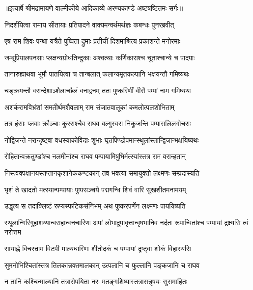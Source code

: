 {॥इत्यार्षे श्रीमद्रामायणे वाल्मीकीये आदिकाव्ये अरण्यकाण्डे अष्टषष्टितमः सर्गः॥}


\twolineshloka
{निदर्शयित्वा रामाय सीतायाः प्रतिपादने}
{वाक्यमन्वर्थमर्थज्ञः कबन्धः पुनरब्रवीत्} %

\twolineshloka
{एष राम शिवः पन्था यत्रैते पुष्पिता द्रुमाः}
{प्रतीचीं दिशमाश्रित्य प्रकाशन्ते मनोरमाः} %

\twolineshloka
{जम्बूप्रियालपनसाः प्लक्षन्यग्रोधतिन्दुकाः}
{अश्वत्थाः कर्णिकाराश्च चूताश्चान्ये च पादपाः} %

\twolineshloka
{तानारुह्याथवा भूमौ पातयित्वा च तान्बलात्}
{फलान्यमृतकल्पानि भक्षयन्तौ गमिष्यथः} %

\twolineshloka
{चङ्क्रमन्तौ वरान्देशाञ्शैलाच्छैलं वनाद्वनम्}
{ततः पुष्करिणीं वीरौ पम्पां नाम गमिष्यथः} %

\twolineshloka
{अशर्करामविभ्रंशां समतीर्थमशैवलाम्}
{राम संजातवालूकां कमलोत्पलशोभिताम्} %

\twolineshloka
{तत्र हंसाः प्लवाः क्रौञ्चाः कुरराश्चैव राघव}
{वल्गुस्वरा निकूजन्ति पम्पासलिलगोचराः} %

\twolineshloka
{नोद्विजन्ते नरान्दृष्ट्वा वधस्याकोविदाः शुभाः}
{घृतपिण्डोपमान्स्थूलांस्तान्द्विजान्भक्षयिष्यथः} %

\twolineshloka
{रोहितान्वक्रतुण्डांश्च नलमीनांश्च राघव}
{पम्पायामिषुभिर्मत्स्यांस्तत्र राम वरान्हतान्} %

\twolineshloka
{निस्त्वक्पक्षानयस्तप्तानकृशानेककण्टकान्}
{तव भक्त्या समायुक्तो लक्ष्मणः सम्प्रदास्यति} %

\twolineshloka
{भृशं ते खादतो मत्स्यान्पम्पायाः पुष्पसञ्चये}
{पद्मगन्धि शिवं वारि सुखशीतमनामयम्} %

\twolineshloka
{उद्धृत्य स तदाक्लिष्टं रूप्यस्फटिकसंनिभम्}
{अथ पुष्करपर्णेन लक्ष्मणः पाययिष्यति} %

\threelineshloka
{स्थूलान्गिरिगुहाशय्यान्वराहान्वनचारिणः}
{अपां लोभादुपावृत्तान्वृषभानिव नर्दतः}
{रूपान्वितांश्च पम्पायां द्रक्ष्यसि त्वं नरोत्तम} %

\twolineshloka
{सायाह्ने विचरन्राम विटपी माल्यधारिणः}
{शीतोदकं च पम्पायां दृष्ट्वा शोकं विहास्यसि} %

\twolineshloka
{सुमनोभिश्चितांस्तत्र तिलकान्नक्तमालकान्}
{उत्पलानि च फुल्लानि पङ्कजानि च राघव} %

\twolineshloka
{न तानि कश्चिन्माल्यानि तत्रारोपयिता नरः}
{मतङ्गशिष्यास्तत्रासन्नृषयः सुसमाहितः} %

